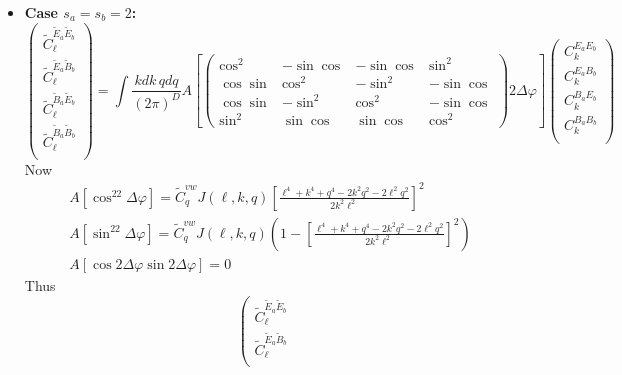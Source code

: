 \documentclass[a4paper,10pt]{article}
\begin{document}
\begin{itemize}
      \item {\bf Case $s_a=s_b=2$:}
        \begin{equation}
          \left(
            \begin{array}{c}
	      \tilde{C}^{\tilde{E}_a\tilde{E}_b}_\ell\\
	      \tilde{C}^{\tilde{E}_a\tilde{B}_b}_\ell\\
	      \tilde{C}^{\tilde{B}_a\tilde{E}_b}_\ell\\
	      \tilde{C}^{\tilde{B}_a\tilde{B}_b}_\ell\\
	    \end{array}\right)=\int\frac{kdk\,qdq}{(2\pi)^D}
	    A\left[
            \left(
            \begin{array}{cccc}
              \cos^2   & -\sin\cos & -\sin\cos &  \sin^2  \\
              \cos\sin & \cos^2    & -\sin^2   & -\sin\cos\\
              \cos\sin & -\sin^2   &  \cos^2   & -\sin\cos\\
              \sin^2   & \sin\cos  &  \sin\cos &  \cos^2
            \end{array}\right)2\Delta\varphi\right]
            \left(
            \begin{array}{c}
              C^{E_aE_b}_k \\
              C^{E_aB_b}_k \\
              C^{B_aE_b}_k \\
              C^{B_aB_b}_k \\
            \end{array}\right)
       \end{equation}
       Now
       \begin{align}
         &A\left[\cos^22\Delta\varphi\right]
         =\tilde{C}^{vw}_qJ(\ell,k,q)\left[\frac{\ell^4+k^4+q^4-2k^2q^2-2\ell^2q^2}{2k^2\ell^2}\right]^2\\
         &A\left[\sin^22\Delta\varphi\right]
         =\tilde{C}^{vw}_qJ(\ell,k,q)\left(1-\left[\frac{\ell^4+k^4+q^4-2k^2q^2-2\ell^2q^2}{2k^2\ell^2}\right]^2\right)\\
         &A\left[\cos2\Delta\varphi\sin2\Delta\varphi\right]=0
       \end{align}
       Thus
       \begin{equation}
         \left(
         \begin{array}{c}
	   \tilde{C}^{\tilde{E}_a\tilde{E}_b}_\ell\\
	   \tilde{C}^{\tilde{E}_a\tilde{B}_b}_\ell\\

\end{array}
\end{equation}
\end{itemize}
\end{document}

